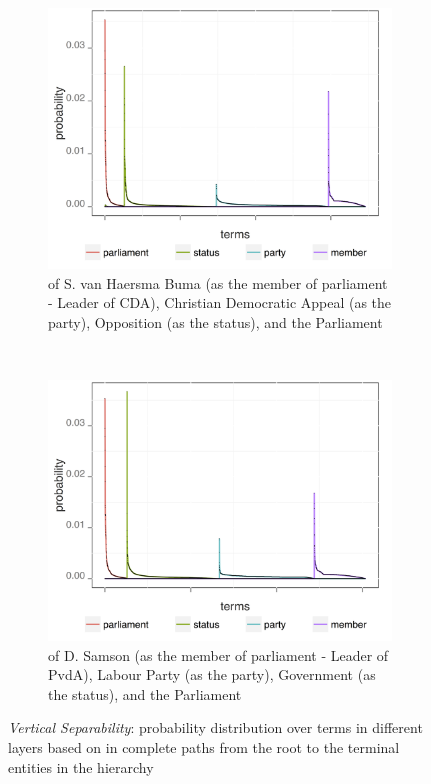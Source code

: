 \begin{figure}[!t]
        \centering
        \begin{subfigure}[b]{0.45\textwidth}
\includegraphics[width=\linewidth]{02-part-01/chapter-03/figs_and_tables/img_nlm02316.png}
\caption{\label{fig:VSO} \achswlm of S. van Haersma Buma (as the member of parliament - Leader of CDA), Christian Democratic Appeal (as the party), Opposition (as the status), and the Parliament}
        \end{subfigure}
        ~~~~~~~~
        \begin{subfigure}[b]{0.45\textwidth}
        
\centering
\includegraphics[width=\linewidth]{02-part-01/chapter-03/figs_and_tables/img_nlm02335.png}
\caption{\label{fig:VSC} \achswlm of D. Samson (as the member of parliament - Leader of PvdA), Labour Party (as the party), Government (as the status), and the Parliament}

        \end{subfigure}
        
        \caption{\label{fig:VS} \emph{Vertical Separability}: probability distribution over terms in different layers based on \hswlms in complete paths from the root to the terminal entities in the hierarchy}

\end{figure}

